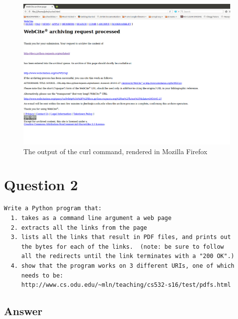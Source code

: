 \documentclass[letterpaper,10pt]{article}
\begin{document}
\begin{figure}[!ht]
\includegraphics[scale=0.3]{images/curled.png}
\caption{The output of the curl command, rendered in Mozilla Firefox}
\label{fig:curled}
\end{figure}

\newpage
\section*{Question 2}

\begin{verbatim}
Write a Python program that:
  1. takes as a command line argument a web page
  2. extracts all the links from the page
  3. lists all the links that result in PDF files, and prints out
     the bytes for each of the links.  (note: be sure to follow
     all the redirects until the link terminates with a "200 OK".)
  4. show that the program works on 3 different URIs, one of which
     needs to be: 
     http://www.cs.odu.edu/~mln/teaching/cs532-s16/test/pdfs.html
\end{verbatim}
\subsection*{Answer}


  
\end{document}
